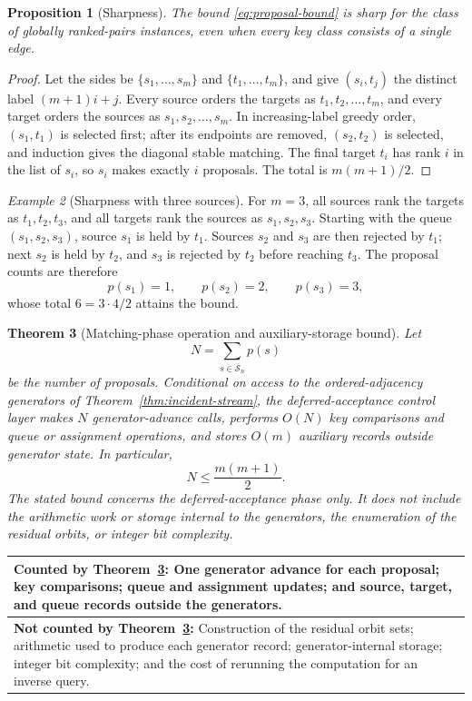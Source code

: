 \documentclass[11pt]{amsart}
\newtheorem{theorem}{Theorem}[section]
\newtheorem{proposition}[theorem]{Proposition}
\theoremstyle{definition}
\theoremstyle{remark}
\newtheorem{example}[theorem]{Example}
\newcommand{\Sbar}{\overline{\mathcal S}_n}
\begin{document}
\begin{proposition}[Sharpness]\label{prop:sharpness}
The bound \eqref{eq:proposal-bound} is sharp for the class of globally
ranked-pairs instances, even when every key class consists of a single edge.
\end{proposition}

\begin{proof}
Let the sides be $\{s_1,\ldots,s_m\}$ and $\{t_1,\ldots,t_m\}$, and give
$(s_i,t_j)$ the distinct label $(m+1)i+j$.  Every source orders the targets as
$t_1,t_2,\ldots,t_m$, and every target orders the sources as
$s_1,s_2,\ldots,s_m$.  In increasing-label greedy order, $(s_1,t_1)$ is
selected first; after its endpoints are removed, $(s_2,t_2)$ is selected,
and induction gives the diagonal stable matching.  The final target $t_i$ has
rank $i$ in the list of $s_i$, so $s_i$ makes exactly $i$ proposals.  The
total is $m(m+1)/2$.
\end{proof}

\begin{example}[Sharpness with three sources]
For $m=3$, all sources rank the targets as $t_1,t_2,t_3$, and all targets
rank the sources as $s_1,s_2,s_3$.  Starting with the queue
$(s_1,s_2,s_3)$, source $s_1$ is held by $t_1$.  Sources $s_2$ and $s_3$ are
then rejected by $t_1$; next $s_2$ is held by $t_2$, and $s_3$ is rejected by
$t_2$ before reaching $t_3$.  The proposal counts are therefore
\[
 p(s_1)=1,
 \qquad p(s_2)=2,
 \qquad p(s_3)=3,
\]
whose total $6=3\cdot4/2$ attains the bound.
\end{example}

\begin{theorem}[Matching-phase operation and auxiliary-storage bound]
\label{thm:complexity}
Let
\[
 N=\sum_{s\in\Sbar}p(s)
\]
be the number of proposals.  Conditional on access to the ordered-adjacency
generators of Theorem~\ref{thm:incident-stream}, the deferred-acceptance
control layer makes $N$ generator-advance calls, performs $O(N)$ key
comparisons and queue or assignment operations, and stores $O(m)$ auxiliary
records outside generator state.
In particular,
\[
 N\le\frac{m(m+1)}2.
\]
The stated bound concerns the deferred-acceptance phase only.  It does not
include the arithmetic work or storage internal to the generators, the
enumeration of the residual orbits, or integer bit complexity.
\end{theorem}

\begin{center}
\renewcommand{\arraystretch}{1.15}
\begin{tabular}{|p{}|}
\hline
\textbf{Counted by Theorem~\ref{thm:complexity}:}
One generator advance for each proposal; key comparisons; queue and
assignment updates; and source, target, and queue records outside the
generators.\\ \hline
\textbf{Not counted by Theorem~\ref{thm:complexity}:}
Construction of the residual orbit sets; arithmetic used to produce each
generator record; generator-internal storage; integer bit complexity; and the
cost of rerunning the computation for an inverse query.\\ \hline
\end{tabular}
\end{center}
\end{document}

